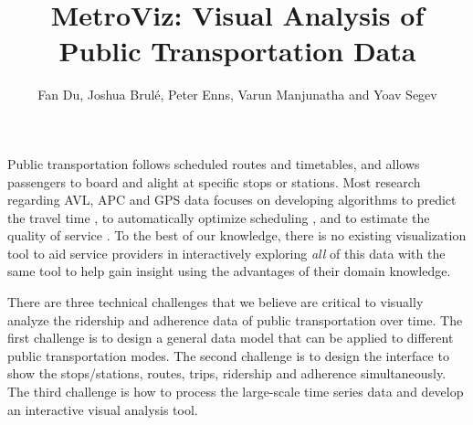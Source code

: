 \documentclass[journal]{vgtc}                %
\title{MetroViz: Visual Analysis of Public Transportation Data}
\author{Fan Du, Joshua Brulé, Peter Enns, Varun Manjunatha and Yoav Segev}
\begin{document}


\maketitle

Public transportation follows scheduled routes and timetables, and allows passengers to board and alight at specific stops or stations. Most research regarding AVL, APC and GPS data focuses on developing algorithms to predict the travel time \cite{Lee:2012:HNF:2424321.2424357,Tiesyte2008,Predic2007}, to automatically optimize scheduling \cite{4658140,Yu2007}, and to estimate the quality of service \cite{camus2005estimation,hammerle2005use}. To the best of our knowledge, there is no existing visualization tool to aid service providers in interactively exploring \emph{all} of this data with the same tool to help gain insight using the advantages of their domain knowledge.

There are three technical challenges that we believe are critical to visually analyze the ridership and adherence data of public transportation over time. The first challenge is to design a general data model that can be applied to different public transportation modes. The second challenge is to design the interface to show the stops/stations, routes, trips, ridership and adherence simultaneously. The third challenge is how to process the large-scale time series data and develop an interactive visual analysis tool.
\end{document}
